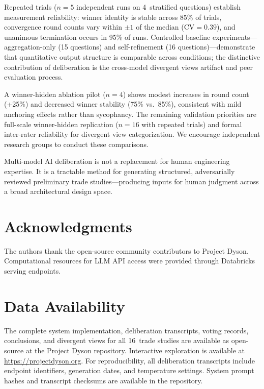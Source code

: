 \documentclass[11pt,a4paper]{article}
\begin{document}
Repeated trials ($n = 5$ independent runs on 4~stratified questions) establish measurement reliability: winner identity is stable across 85\% of trials, convergence round counts vary within $\pm 1$ of the median ($\text{CV} = 0.39$), and unanimous termination occurs in 95\% of runs. Controlled baseline experiments---aggregation-only (15 questions) and self-refinement (16 questions)---demonstrate that quantitative output structure is comparable across conditions; the distinctive contribution of deliberation is the cross-model divergent views artifact and peer evaluation process.

A winner-hidden ablation pilot ($n=4$) shows modest increases in round count (+25\%) and decreased winner stability (75\% vs.\ 85\%), consistent with mild anchoring effects rather than sycophancy. The remaining validation priorities are full-scale winner-hidden replication ($n=16$ with repeated trials) and formal inter-rater reliability for divergent view categorization. We encourage independent research groups to conduct these comparisons.

Multi-model AI deliberation is not a replacement for human engineering expertise. It is a tractable method for generating structured, adversarially reviewed preliminary trade studies---producing inputs for human judgment across a broad architectural design space.

\section*{Acknowledgments}

The authors thank the open-source community contributors to Project Dyson. Computational resources for LLM API access were provided through Databricks serving endpoints.

\section*{Data Availability}

The complete system implementation, deliberation transcripts, voting records, conclusions, and divergent views for all 16~trade studies are available as open-source at the Project Dyson repository. Interactive exploration is available at \url{https://projectdyson.org}. For reproducibility, all deliberation transcripts include endpoint identifiers, generation dates, and temperature settings. System prompt hashes and transcript checksums are available in the repository.
\end{document}
